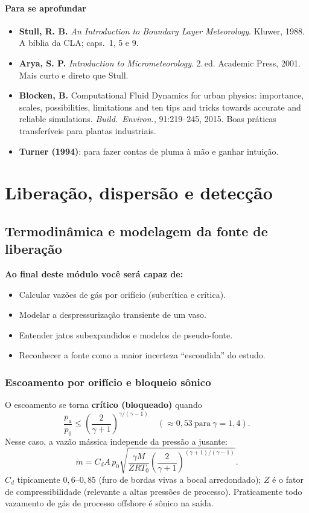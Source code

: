 \documentclass[10pt,a4paper,twocolumn,openany]{report}
\newenvironment{conceito}[1]{\section{#1}}{\par}
\newenvironment{aprofundar}{\subsection*{\textcolor{amarelo}{Para se aprofundar}}\small}{\par}
\newcommand{\objetivos}{\noindent\textbf{Ao final deste módulo você será capaz de:}}
\begin{document}
\begin{aprofundar}
\begin{itemize}[leftmargin=*]
  \item \textbf{Stull, R. B.} \emph{An Introduction to Boundary Layer Meteorology}. Kluwer, 1988. A bíblia da CLA; caps.\ 1, 5 e 9.
  \item \textbf{Arya, S. P.} \emph{Introduction to Micrometeorology}. 2.\,ed. Academic Press, 2001. Mais curto e direto que Stull.
  \item \textbf{Blocken, B.} Computational Fluid Dynamics for urban physics: importance, scales, possibilities, limitations and ten tips and tricks towards accurate and reliable simulations. \emph{Build.\ Environ.}, 91:219--245, 2015. Boas práticas transferíveis para plantas industriais.
  \item \textbf{Turner (1994)}: para fazer contas de pluma à mão e ganhar intuição.
\end{itemize}
\end{aprofundar}

\part{Liberação, dispersão e detecção}

\chapter{Termodinâmica e modelagem da fonte de liberação}

\objetivos
\begin{itemize}
  \item Calcular vazões de gás por orifício (subcrítica e crítica).
  \item Modelar a despressurização transiente de um vaso.
  \item Entender jatos subexpandidos e modelos de pseudo-fonte.
  \item Reconhecer a fonte como a maior incerteza ``escondida'' do estudo.
\end{itemize}

\begin{conceito}{Escoamento por orifício e bloqueio sônico}
O escoamento se torna \textbf{crítico (bloqueado)} quando
\[
  \frac{p_a}{p_0} \le \left(\frac{2}{\gamma+1}\right)^{\gamma/(\gamma-1)}
  \quad(\approx0{,}53\ \text{para}\ \gamma=1{,}4).
\]
Nesse caso, a vazão mássica independe da pressão a jusante:
\[
  \dot m = C_d A\, p_0\sqrt{\frac{\gamma M}{Z R T_0}
  \left(\frac{2}{\gamma+1}\right)^{(\gamma+1)/(\gamma-1)}} .
\]
$C_d$ tipicamente $0{,}6$--$0{,}85$ (furo de bordas vivas a bocal arredondado);
$Z$ é o fator de compressibilidade (relevante a altas pressões de processo).
Praticamente todo vazamento de gás de processo offshore é sônico na saída.
\end{conceito}
\end{document}
